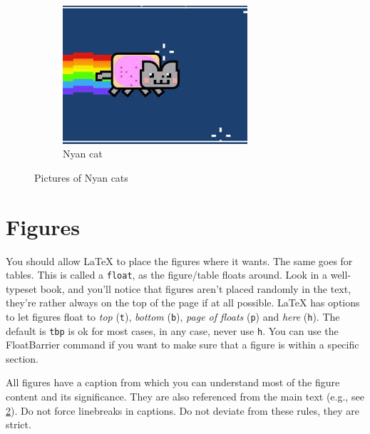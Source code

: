 \documentclass[12pt, %
a4paper, %
twoside, %
openright, %
abstract=on, %
DIV=11,      %
BCOR=8mm]{scrbook} %
\begin{document}
\begin{figure}
        ~ %
        \begin{subfigure}[b]{0.3\textwidth}
            \includegraphics[width=\textwidth]{img/cat.jpeg}
            \caption{Nyan cat}
            \label{fig:cat3}  
        \end{subfigure}
        \caption[Nyan cats]{Pictures of Nyan cats}\label{fig:cats}
    \end{figure}


    \section{Figures}
    You should  allow \LaTeX{} to place  the figures where it  wants.  The 
    same  goes  for  tables.   This  is  called  a  \verb+float+,  as  the 
    figure/table floats around.   Look in a well-typeset  book, and you'll 
    notice that figures aren't placed randomly in the text, they're rather 
    always  on the  top  of  the page  if  at  all possible. \LaTeX{}  has 
    options to  let figures float to  \emph{top} (\verb+t+), \emph{bottom} 
    (\verb+b+),   \emph{page  of   floats}   (\verb+p+)  and   \emph{here} 
    (\verb+h+).  The  default is \verb+tbp+ is  ok for most cases,  in any 
    case, never use \verb+h+.  You can use the FloatBarrier command if you 
    want to make sure that a figure is within a specific section.          

    All figures have  a caption from which you can  understand most of the 
    figure content  and its significance.   They are also  referenced from 
    the main text (e.g., see \cref{fig:cats}).  Do not force linebreaks in 
    captions.  Do not deviate from these rules, they are strict.           
\end{document}
